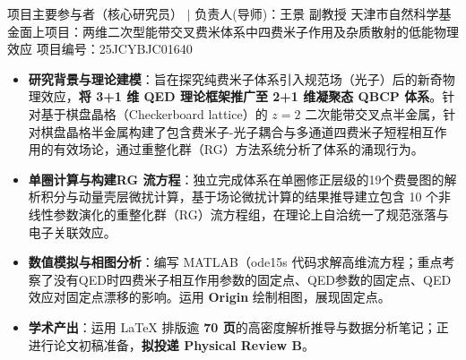 



\begin{cventries}

 \cventry
    {项目主要参与者（核心研究员） $|$ 负责人(导师)：王景 副教授} 
    {天津市自然科学基金面上项目：两维二次型能带交叉费米体系中四费米子作用及杂质散射的低能物理效应} 
    {\vspace{1em}项目编号：25JCYBJC01640} 
    {} %
    {
      \begin{cvitems}
        \vspace{0.5mm}
        \item[] 
          \begin{itemize}
            \item {\textbf{研究背景与理论建模}：旨在探究纯费米子体系引入规范场（光子）后的新奇物理效应，\textbf{将 3+1 维 QED 理论框架推广至 2+1 维凝聚态 QBCP 体系}。针对基于棋盘晶格（Checkerboard lattice）的 $z=2$ 二次能带交叉点半金属，针对棋盘晶格半金属构建了包含费米子-光子耦合与多通道四费米子短程相互作用的有效场论，通过重整化群（RG）方法系统分析了体系的涌现行为。}
            \item {\textbf{单圈计算与构建RG 流方程}：独立完成体系在单圈修正层级的19个费曼图的解析积分与动量壳层微扰计算，基于场论微扰计算的结果推导建立包含 10 个非线性参数演化的重整化群（RG）流方程组，在理论上自洽统一了规范涨落与电子关联效应。}
            \item {\textbf{数值模拟与相图分析}：编写 MATLAB（ode15s 代码求解高维流方程；重点考察了没有QED时四费米子相互作用参数的固定点、QED参数的固定点、QED 效应对固定点漂移的影响。运用 \textbf{Origin} 绘制相图，展现固定点。}
            \item {\textbf{学术产出}：运用 LaTeX 排版逾 \textbf{70 页}的高密度解析推导与数据分析笔记；正进行论文初稿准备，\textbf{拟投递 Physical Review B}。}
          \end{itemize}
        \vspace{0.8em}

\end{cvitems}}
\end{cventries}
